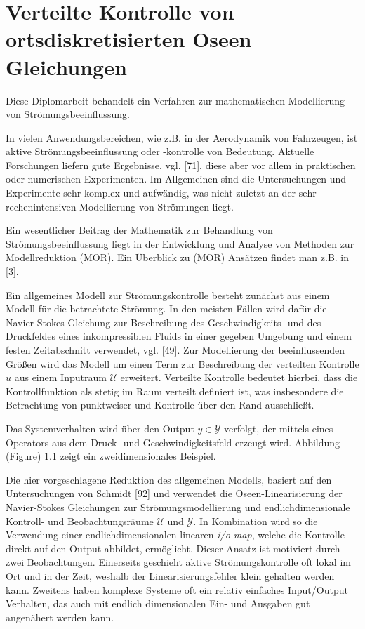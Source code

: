 \documentclass[a4paper,10pt,BCOR=15mm]{scrbook}
\begin{document}




\newpage 
\thispagestyle{empty}
\quad 


\chapter*{Verteilte Kontrolle von ortsdiskretisierten Oseen Gleichungen}


Diese Diplomarbeit behandelt ein Verfahren zur mathematischen Modellierung von Strömungsbeeinflussung. 

In vielen Anwendungsbereichen, wie z.B. in der Aerodynamik von Fahrzeugen, ist aktive Str\"omungsbeeinflussung oder -kontrolle von Bedeutung. Aktuelle Forschungen liefern gute Ergebnisse, vgl. [71], diese aber vor allem in praktischen oder numerischen Experimenten. Im Allgemeinen sind die Untersuchungen und Experimente sehr komplex und aufw\"andig, was nicht zuletzt an der sehr rechenintensiven Modellierung von Str\"omungen liegt.

Ein wesentlicher Beitrag der Mathematik zur Behandlung von Str\"omungsbeeinflussung liegt in der Entwicklung und Analyse von Methoden zur Modellreduktion (MOR). Ein \"Uberblick zu (MOR) Ans\"atzen findet man z.B. in [3]. 

Ein allgemeines Modell zur Str\"omungskontrolle besteht zun\"achst aus einem Modell f\"ur die betrachtete Str\"omung. In den meisten F\"allen wird daf\"ur die Navier-Stokes Gleichung zur Beschreibung des Geschwindigkeits- und des Druckfeldes eines inkompressiblen Fluids in einer gegeben Umgebung und einem festen Zeitabschnitt verwendet, vgl. [49]. Zur Modellierung der beeinflussenden Gr\"oßen wird das Modell um einen Term zur Beschreibung der verteilten Kontrolle $u$ aus einem Inputraum $\mathcal U$ erweitert. Verteilte Kontrolle bedeutet hierbei, dass die Kontrollfunktion als stetig im Raum verteilt definiert ist, was insbesondere die Betrachtung von punktweiser und Kontrolle \"uber den Rand ausschließt.

Das Systemverhalten wird \"uber den Output $y \in \mathcal Y$ verfolgt, der mittels eines Operators aus dem Druck- und Geschwindigkeitsfeld erzeugt wird. Abbildung (Figure) 1.1 zeigt ein zweidimensionales Beispiel. 

Die hier vorgeschlagene Reduktion des allgemeinen Modells, basiert auf den Untersuchungen von Schmidt [92] und verwendet die Oseen-Linearisierung der Navier-Stokes Gleichungen zur Str\"omungsmodellierung und endlichdimensionale Kontroll- und Beobachtungsr\"aume $\mathcal U$ und $\mathcal Y$. In Kombination wird so die Verwendung einer endlichdimensionalen linearen \textit{i/o map}, welche die Kontrolle direkt auf den Output abbildet, erm\"oglicht. Dieser Ansatz ist motiviert durch zwei Beobachtungen. Einerseits geschieht aktive Strömungskontrolle oft lokal im Ort und in der Zeit, weshalb der Linearisierungsfehler klein gehalten werden kann. Zweitens haben komplexe Systeme oft ein relativ einfaches Input/Output Verhalten, das auch mit endlich dimensionalen Ein- und Ausgaben gut angen\"ahert werden kann.
\end{document}
